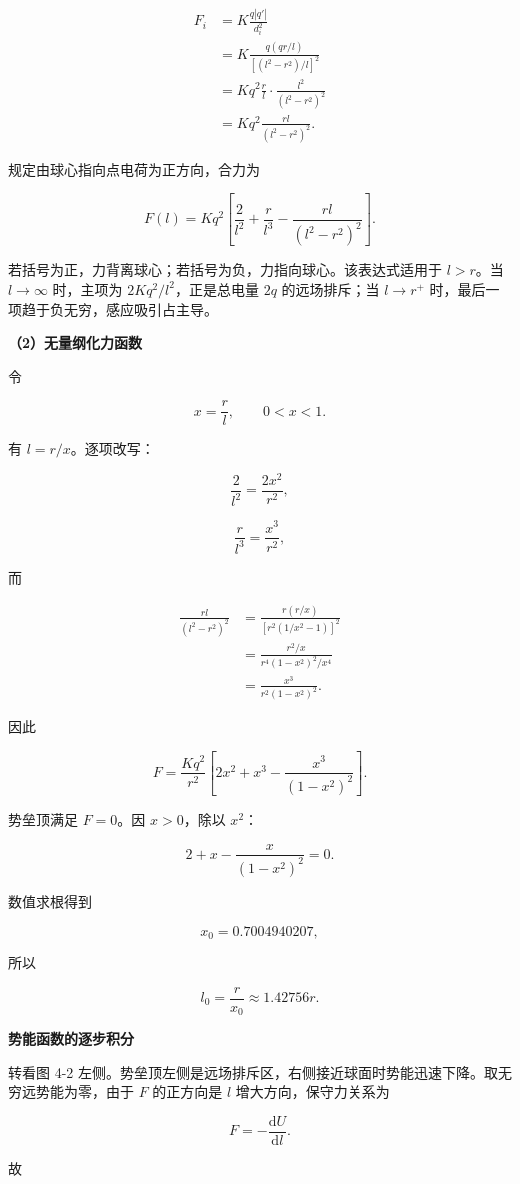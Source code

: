 \documentclass[12pt,a4paper,UTF8]{ctexart}
\begin{document}
\[\begin{aligned}
F_i
&=K\frac{q|q'|}{d_i^2}\\
&=K\frac{q(qr/l)}{[(l^2-r^2)/l]^2}\\
&=Kq^2\frac{r}{l}\cdot\frac{l^2}{(l^2-r^2)^2}\\
&=Kq^2\frac{rl}{(l^2-r^2)^2}.
\end{aligned}\]

规定由球心指向点电荷为正方向，合力为

\[\boxed{
F(l)=Kq^2\left[
\frac{2}{l^2}+\frac{r}{l^3}
-\frac{rl}{(l^2-r^2)^2}
\right]
}.\]

若括号为正，力背离球心；若括号为负，力指向球心。该表达式适用于
\(l>r\)。当 \(l\to\infty\) 时，主项为 \(2Kq^2/l^2\)，正是总电量 \(2q\)
的远场排斥；当 \(l\to r^+\) 时，最后一项趋于负无穷，感应吸引占主导。

\textbf{（2）无量纲化力函数}

令

\[x=\frac rl,\qquad 0<x<1.\]

有 \(l=r/x\)。逐项改写：

\[\frac{2}{l^2}=\frac{2x^2}{r^2},\]

\[\frac{r}{l^3}=\frac{x^3}{r^2},\]

而

\[\begin{aligned}
\frac{rl}{(l^2-r^2)^2}
&=\frac{r(r/x)}{[r^2(1/x^2-1)]^2}\\
&=\frac{r^2/x}{r^4(1-x^2)^2/x^4}\\
&=\frac{x^3}{r^2(1-x^2)^2}.
\end{aligned}\]

因此

\[F=\frac{Kq^2}{r^2}\left[
2x^2+x^3-\frac{x^3}{(1-x^2)^2}
\right].\]

势垒顶满足 \(F=0\)。因 \(x>0\)，除以 \(x^2\)：

\[\boxed{
2+x-\frac{x}{(1-x^2)^2}=0
}.\]

数值求根得到

\[\boxed{x_0=0.7004940207},\]

所以

\[l_0=\frac{r}{x_0}\approx1.42756r.\]

\textbf{势能函数的逐步积分}

转看图 4-2
左侧。势垒顶左侧是远场排斥区，右侧接近球面时势能迅速下降。取无穷远势能为零，由于
\(F\) 的正方向是 \(l\) 增大方向，保守力关系为

\[F=-\frac{\mathrm{d}U}{\mathrm{d}l}.\]

故
\end{document}
